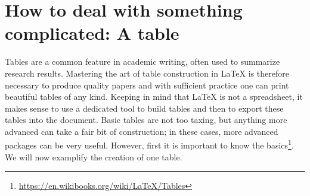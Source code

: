 \section{How to deal with something complicated: A table}
Tables are a common feature in academic writing, often used to summarize research results. Mastering the art of table construction in LaTeX is therefore necessary to produce quality papers and with sufficient practice one can print beautiful tables of any kind. Keeping in mind that LaTeX is not a spreadsheet, it makes sense to use a dedicated tool to build tables and then to export these tables into the document. Basic tables are not too taxing, but anything more advanced can take a fair bit of construction; in these cases, more advanced packages can be very useful. However, first it is important to know the basics\footnote{\url{https://en.wikibooks.org/wiki/LaTeX/Tables}}.
We will now examplify the creation of one table.


 